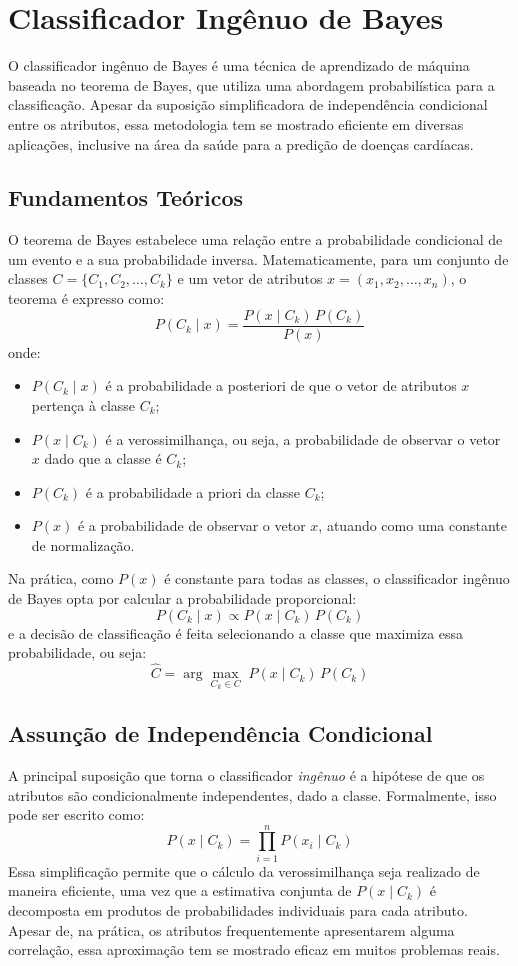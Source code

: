 \documentclass[conference]{IEEEtran}
\begin{document}
\section{Classificador Ingênuo de Bayes}
O classificador ingênuo de Bayes é uma técnica de aprendizado de máquina baseada no teorema de Bayes, que utiliza uma abordagem probabilística para a classificação. Apesar da suposição simplificadora de independência condicional entre os atributos, essa metodologia tem se mostrado eficiente em diversas aplicações, inclusive na área da saúde para a predição de doenças cardíacas.

\subsection{Fundamentos Teóricos}
O teorema de Bayes estabelece uma relação entre a probabilidade condicional de um evento e a sua probabilidade inversa. Matematicamente, para um conjunto de classes $C = \{C_1, C_2, \ldots, C_k\}$ e um vetor de atributos $x = (x_1, x_2, \ldots, x_n)$, o teorema é expresso como:
\[
P(C_k \mid x) = \frac{P(x \mid C_k) \, P(C_k)}{P(x)}
\]
onde:
\begin{itemize}
    \item $P(C_k \mid x)$ é a probabilidade a posteriori de que o vetor de atributos $x$ pertença à classe $C_k$;
    \item $P(x \mid C_k)$ é a verossimilhança, ou seja, a probabilidade de observar o vetor $x$ dado que a classe é $C_k$;
    \item $P(C_k)$ é a probabilidade a priori da classe $C_k$;
    \item $P(x)$ é a probabilidade de observar o vetor $x$, atuando como uma constante de normalização.
\end{itemize}

Na prática, como $P(x)$ é constante para todas as classes, o classificador ingênuo de Bayes opta por calcular a probabilidade proporcional:
\[
P(C_k \mid x) \propto P(x \mid C_k) \, P(C_k)
\]
e a decisão de classificação é feita selecionando a classe que maximiza essa probabilidade, ou seja:
\[
\hat{C} = \arg \max_{C_k \in C} \; P(x \mid C_k) \, P(C_k)
\]

\subsection{Assunção de Independência Condicional}
A principal suposição que torna o classificador \textit{ingênuo} é a hipótese de que os atributos são condicionalmente independentes, dado a classe. Formalmente, isso pode ser escrito como:
\[
P(x \mid C_k) = \prod_{i=1}^{n} P(x_i \mid C_k)
\]
Essa simplificação permite que o cálculo da verossimilhança seja realizado de maneira eficiente, uma vez que a estimativa conjunta de $P(x \mid C_k)$ é decomposta em produtos de probabilidades individuais para cada atributo. Apesar de, na prática, os atributos frequentemente apresentarem alguma correlação, essa aproximação tem se mostrado eficaz em muitos problemas reais.
\end{document}
